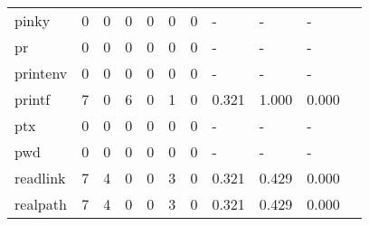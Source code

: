 \begin{longtable}{lp{1.10cm}p{1.10cm}p{1.10cm}p{1.10cm}p{1.10cm}p{1.10cm}p{1.10cm}p{1.10cm}p{1.10cm}p{1.10cm}}
pinky     &                      0 &                                  0 &                                 0 &                                0 &                                 0 &                               0 &                              - &                                     - &                                   - \\
pr        &                      0 &                                  0 &                                 0 &                                0 &                                 0 &                               0 &                              - &                                     - &                                   - \\
printenv  &                      0 &                                  0 &                                 0 &                                0 &                                 0 &                               0 &                              - &                                     - &                                   - \\
printf    &                      7 &                                  0 &                                 6 &                                0 &                                 1 &                               0 &                          0.321 &                                 1.000 &                               0.000 \\
ptx       &                      0 &                                  0 &                                 0 &                                0 &                                 0 &                               0 &                              - &                                     - &                                   - \\
pwd       &                      0 &                                  0 &                                 0 &                                0 &                                 0 &                               0 &                              - &                                     - &                                   - \\
readlink  &                      7 &                                  4 &                                 0 &                                0 &                                 3 &                               0 &                          0.321 &                                 0.429 &                               0.000 \\
realpath  &                      7 &                                  4 &                                 0 &                                0 &                                 3 &                               0 &                          0.321 &                                 0.429 &                               0.000 \\

\end{longtable}
